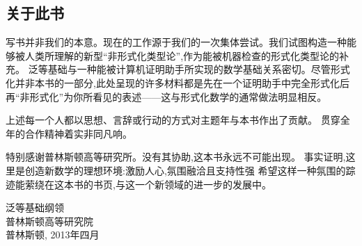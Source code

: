 \subsection*{关于此书}

写书并非我们的本意。现在的工作源于我们的一次集体尝试。我们试图构造一种能够被人类所理解的新型“非形式化类型论”,作为能被机器检查的形式化类型论的补充。
泛等基础与一种能被计算机证明助手所实现的数学基础关系密切。尽管形式化并非本书的一部分,此处呈现的许多材料都是先在一个证明助手中完全形式化后
再“非形式化”为你所看见的表述——这与形式化数学的通常做法明显相反。

上述每一个人都以思想、言辞或行动的方式对主题年与本书作出了贡献。
贯穿全年的合作精神着实非同凡响。

\mentalpause

特别感谢普林斯顿高等研究所。没有其协助,这本书永远不可能出现。
事实证明,这里是创造新数学的理想环境:激励人心,氛围融洽且支持性强
希望这样一种氛围的踪迹能萦绕在这本书的书页,与这一个新领域的进一步的发展中。

\bigskip

\begin{flushright}
泛等基础纲领\\
普林斯顿高等研究院\\
普林斯顿, 2013年四月
\end{flushright}


